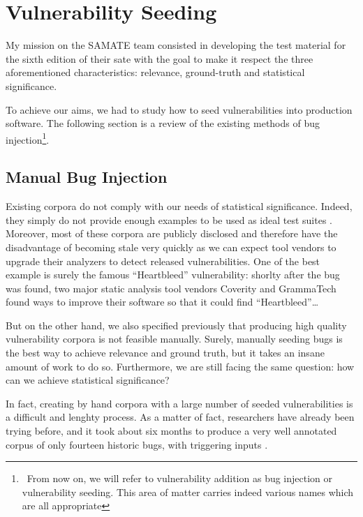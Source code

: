\section{Vulnerability Seeding}
\label{sec:introduction-of-vulnerabilities-to-code}

\vspace{-0.3cm}

My mission on the SAMATE team consisted in developing the test material for the sixth edition of their \acrlong{sate} with the goal to make it respect the three aforementioned characteristics: relevance, ground-truth and statistical significance.

To achieve our aims, we had to study how to seed vulnerabilities into production software. The following section is a review of the existing methods of bug injection\footnote{~From now on, we will refer to vulnerability addition as bug injection or vulnerability seeding. This area of matter carries indeed various names which are all appropriate}.

\vspace{-0.4cm}

\subsection{Manual Bug Injection}

Existing corpora do not comply with our needs of statistical significance. Indeed, they simply do not provide enough examples to be used as ideal test suites \cite{okun2013report,okun2016sate}. Moreover, most of these corpora are publicly disclosed and therefore have the disadvantage of becoming stale very quickly as we can expect tool vendors to upgrade their analyzers to detect released vulnerabilities. One of the best example is surely the famous ``Heartbleed'' vulnerability: shorlty after the bug was found, two major static analysis tool vendors Coverity and GrammaTech found ways to improve their software so that it could find ``Heartbleed''\dots

But on the other hand, we also specified previously that producing high quality vulnerability corpora is not feasible manually. Surely, manually seeding bugs is the best way to achieve relevance and ground truth, but it takes an insane amount of work to do so. Furthermore, we are still facing the same question: how can we achieve statistical significance?

In fact, creating by hand corpora with a large number of seeded vulnerabilities is a difficult and lenghty process. As a matter of fact, researchers have already been trying before, and it took about six months to produce a very well annotated corpus of only fourteen historic bugs, with triggering inputs \cite{dolan2016lava}.

